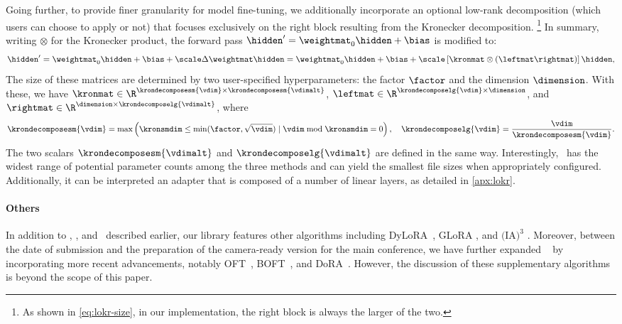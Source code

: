 Going further, to provide finer granularity for model fine-tuning, we additionally incorporate an optional low-rank decomposition (which users can choose to apply or not) that focuses exclusively on the right block resulting from the Kronecker decomposition.%
\footnote{As shown in \cref{eq:lokr-size}, in our implementation, the right block is always the larger of the two.}
In summary, 
writing $\otimes$ for the Kronecker product,
the forward pass $\hidden^{\prime} = \weightmat_{0}\hidden+\bias$ is modified to:
%
\begin{equation}
\label{equ:lokr}
\hidden^{\prime} = \weightmat_{0}\hidden +\bias + \scale \Delta \weightmat \hidden  =  \weightmat_{0}\hidden  +\bias + \scale\left[\kronmat \otimes (\leftmat \rightmat)\right] \hidden,
\end{equation}
%
The size of these matrices are determined by two user-specified hyperparameters: the factor $\factor$ and the dimension $\dimension$.
With these, we have 
$ \kronmat \in \R^{\krondecomposesm{\vdim} \times \krondecomposesm{\vdimalt}} $,
$ \leftmat \in \R^{\krondecomposelg{\vdim} \times \dimension} $, and 
$ \rightmat \in \R^{\dimension \times \krondecomposelg{\vdimalt}} $, where
%
\begin{equation}
\label{eq:lokr-size}
\krondecomposesm{\vdim} = \max\left(\kronsmdim \leq \min(\factor, \sqrt{\vdim}) \mid \vdim \bmod \kronsmdim = 0 \right), ~~~
\krondecomposelg{\vdim} = \frac{\vdim}{\krondecomposesm{\vdim}}.
\end{equation}
%
The two scalars $\krondecomposesm{\vdimalt}$ and $\krondecomposelg{\vdimalt}$ are defined in the same way.
Interestingly, \lokr~has the widest range of potential parameter counts among the three methods and can yield the smallest file sizes when appropriately configured. Additionally, it can be interpreted an adapter that is composed of a number of linear layers, as detailed in \cref{apx:lokr}.

\paragraph{Others\afterhead}
In addition to \lora, \loha, and \lokr~described earlier, our library features other algorithms including DyLoRA~\citep{va2022DyLoRA}, GLoRA \citep{chavan2023oneforall}, and $\text{(IA)}^3$ \citep{liu2022fewshot}.
Moreover, between the date of submission and the preparation of the camera-ready version for the main conference, we have further expanded \lycoris~ by incorporating more recent advancements, notably OFT~\citep{qiu2023controlling}, BOFT~\citep{liu2024parameterefficient}, and DoRA~\citep{liu2024dora}.
However, the discussion of these supplementary algorithms is beyond the scope of this paper.


